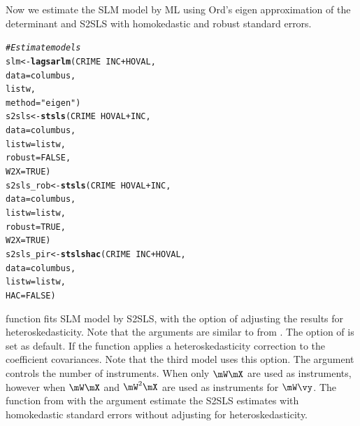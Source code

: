 \documentclass[english,12pt]{book}\usepackage[]{graphicx}\usepackage[]{xcolor}
\makeatletter
\newcommand{\hlnum}[1]{\textcolor[rgb]{0.686,0.059,0.569}{#1}}%
\newcommand{\hlstr}[1]{\textcolor[rgb]{0.192,0.494,0.8}{#1}}%
\newcommand{\hlcom}[1]{\textcolor[rgb]{0.678,0.584,0.686}{\textit{#1}}}%
\newcommand{\hlopt}[1]{\textcolor[rgb]{0,0,0}{#1}}%
\newcommand{\hlstd}[1]{\textcolor[rgb]{0.345,0.345,0.345}{#1}}%
\newcommand{\hlkwb}[1]{\textcolor[rgb]{0.69,0.353,0.396}{#1}}%
\newcommand{\hlkwc}[1]{\textcolor[rgb]{0.333,0.667,0.333}{#1}}%
\newcommand{\hlkwd}[1]{\textcolor[rgb]{0.737,0.353,0.396}{\textbf{#1}}}%
\newenvironment{kframe}{%
 \def\at@end@of@kframe{}%
 \ifinner\ifhmode%
  \def\at@end@of@kframe{\end{minipage}}%
  \begin{minipage}{\columnwidth}%
 \fi\fi%
 \def\FrameCommand##1{\hskip\@totalleftmargin \hskip-\fboxsep
 \colorbox{shadecolor}{##1}\hskip-\fboxsep
     \hskip-\linewidth \hskip-\@totalleftmargin \hskip\columnwidth}%
 \MakeFramed {\advance\hsize-\width
   \@totalleftmargin\z@ \linewidth\hsize
   \@setminipage}}%
 {\par\unskip\endMakeFramed%
 \at@end@of@kframe}
\newenvironment{knitrout}{}{} %
\makeatother
\begin{document}
Now we estimate the SLM model by ML using Ord's eigen approximation of the determinant and S2SLS with homokedastic and robust standard errors. 

\begin{knitrout}
\color{fgcolor}\begin{kframe}
\begin{alltt}
\hlcom{# Estimate models}
\hlstd{slm}      \hlkwb{<-} \hlkwd{lagsarlm}\hlstd{(CRIME} \hlopt{~} \hlstd{INC} \hlopt{+} \hlstd{HOVAL,}
                     \hlkwc{data} \hlstd{= columbus,}
                     \hlstd{listw,}
                     \hlkwc{method} \hlstd{=} \hlstr{"eigen"}\hlstd{)}
\hlstd{s2sls}    \hlkwb{<-} \hlkwd{stsls}\hlstd{(CRIME} \hlopt{~} \hlstd{HOVAL} \hlopt{+} \hlstd{INC,}
                  \hlkwc{data} \hlstd{=  columbus,}
                  \hlkwc{listw} \hlstd{= listw,}
                  \hlkwc{robust} \hlstd{=} \hlnum{FALSE}\hlstd{,}
                  \hlkwc{W2X} \hlstd{=} \hlnum{TRUE}\hlstd{)}
\hlstd{s2sls_rob} \hlkwb{<-} \hlkwd{stsls}\hlstd{(CRIME} \hlopt{~} \hlstd{HOVAL} \hlopt{+} \hlstd{INC,}
                   \hlkwc{data} \hlstd{=  columbus,}
                   \hlkwc{listw} \hlstd{= listw,}
                   \hlkwc{robust} \hlstd{=} \hlnum{TRUE}\hlstd{,}
                   \hlkwc{W2X} \hlstd{=} \hlnum{TRUE}\hlstd{)}
\hlstd{s2sls_pir} \hlkwb{<-} \hlkwd{stslshac}\hlstd{(CRIME} \hlopt{~} \hlstd{INC} \hlopt{+} \hlstd{HOVAL,}
                      \hlkwc{data} \hlstd{= columbus,}
                      \hlkwc{listw} \hlstd{= listw,}
                      \hlkwc{HAC} \hlstd{=} \hlnum{FALSE}\hlstd{)}
\end{alltt}
\end{kframe}
\end{knitrout}

 function fits SLM model by S2SLS, with the option of adjusting the results for heteroskedasticity. Note that the arguments are similar to  from . The  option of  is set  as default. If  the function applies a heteroskedasticity correction to the coefficient covariances. Note that the third model  uses this option. The argument  controls the number of instruments. When  only $\mW\mX$ are used as instruments, however when   $\mW\mX$ and $\mW^2\mX$ are used as instruments for $\mW\vy$. The function  from  with the argument  estimate the S2SLS estimates with homokedastic standard errors without adjusting for heteroskedasticity.
\end{document}
